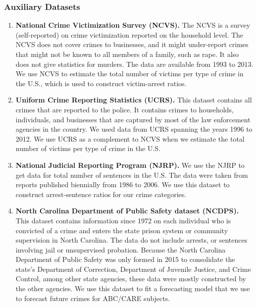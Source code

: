 \subsubsection{Auxiliary Datasets}
\begin{enumerate}
\item\textbf{ National Crime Victimization Survey (NCVS).} The NCVS is a survey (self-reported) on crime victimization reported on the household level. The NCVS does not cover crimes to businesses, and it might under-report crimes that might not be known to all members of a family, such as rape. It also does not give statistics for murders. The data are available from 1993 to 2013. We use NCVS to estimate the total number of victims per type of crime in the U.S., which is used to construct victim-arrest ratios.
\item \textbf{Uniform Crime Reporting Statistics (UCRS).} This dataset contains all crimes that are reported to the police. It contains crimes to households, individuals, and businesses that are captured by most of the law enforcement agencies in the country. We used data from UCRS spanning the years 1996 to 2012. We use UCRS as a complement to NCVS when we estimate the total number of victims per type of crime in the U.S. %
\item \textbf{National Judicial Reporting Program (NJRP).} We use the NJRP to get data for total number of sentences in the U.S. The data were taken from reports published biennially from 1986 to 2006. We use this dataset to construct arrest-sentence ratios for our crime categories.
\item \textbf{North Carolina Department of Public Safety dataset (NCDPS).} This dataset contains information since 1972 on each individual who is convicted of a crime and enters the state prison system or community supervision in North Carolina. The data do not include arrests, or sentences involving jail or unsupervised probation. Because the North Carolina Department of Public Safety was only formed in 2015 to consolidate the state's Department of Correction, Department of Juvenile Justice, and Crime Control, among other state agencies, these data were mostly constructed by the other agencies. We use this dataset to fit a forecasting model that we use to forecast future crimes for ABC/CARE subjects.
\end{enumerate}

